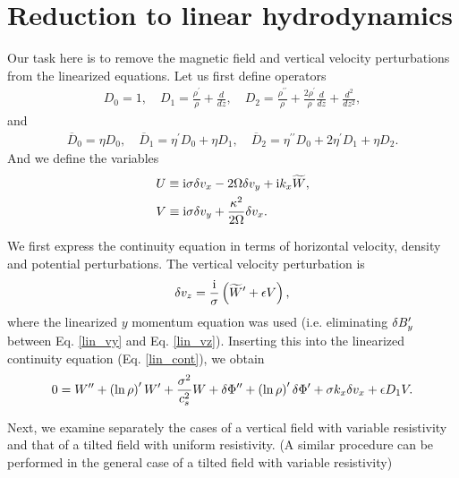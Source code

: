 \section{Reduction to linear hydrodynamics}\label{reduction} 
Our task here is to remove the magnetic field and vertical velocity
perturbations from the linearized equations. Let us first define operators
\begin{align}
  D_0 = 1, \quad D_1 = \frac{\rho^\prime}{\rho} + \frac{d}{dz}, \quad
  D_2 = \frac{\rho^{\prime\prime}}{\rho} +
  \frac{2\rho^\prime}{\rho}\frac{d}{dz} + \frac{d^2}{d z^2},
\end{align}
and 
\begin{align}
  \overline{D}_0 = \eta D_0, \quad \overline{D}_1 = \eta^\prime D_0 + \eta
  D_1,\quad \overline{D}_2 = \eta^{\prime\prime} D_0 + 2\eta^\prime D_1 +
  \eta D_2. 
\end{align}
And we define the variables
\begin{align}
  &U \equiv \mathrm{i}\sigma\delta v_x - 2\Omega\delta v_y + \mathrm{i} k_x \widetilde{W},\\
  &V \equiv \mathrm{i}\sigma\delta v_y + \frac{\kappa^2}{2\Omega}\delta v_x.
\end{align}

We first express the continuity equation in terms of horizontal
velocity, density and potential perturbations. 
The vertical velocity perturbation is 
\begin{align}
  \delta v_z = \frac{\mathrm{i}}{\sigma}\left(\widetilde{W}^\prime + \epsilon V\right),  
\end{align}
where the linearized $y$ momentum equation was used (i.e. eliminating
$\delta B_y^\prime$ between Eq. \ref{lin_vy} and Eq. \ref{lin_vz}). 
Inserting this into the linearized continuity equation
(Eq. \ref{lin_cont}), we obtain
\begin{align}
0 = W^{\prime\prime} + \left(\ln{\rho}\right)^\prime W^\prime +
\frac{\sigma^2}{c_s^2}W +  \delta \Phi^{\prime\prime} + \left(\ln{\rho}\right)^\prime \delta \Phi^\prime
 + \sigma k_x \delta v_x + \epsilon D_1 V.
\end{align}

Next, we examine separately the cases of a vertical field with
variable resistivity and that of a tilted field with uniform
resistivity. (A similar procedure can be performed in
the general case of a tilted field with variable resistivity) 

